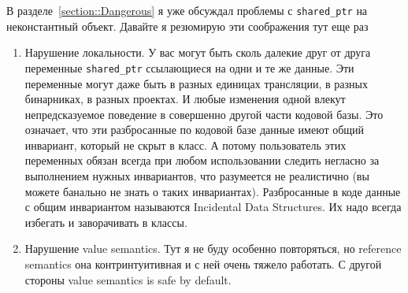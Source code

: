 В разделе~\ref{section::Dangerous} я уже обсуждал проблемы с \texttt{shared\_ptr} на неконстантный объект.
Давайте я резюмирую эти соображения тут еще раз
\begin{enumerate}
\item Нарушение локальности.
У вас могут быть сколь далекие друг от друга переменные \texttt{shared\_ptr} ссылающиеся на одни и те же данные.
Эти переменные могут даже быть в разных единицах трансляции, в разных бинарниках, в разных проектах.
И любые изменения одной влекут непредсказуемое поведение в совершенно другой части кодовой базы.
Это означает, что эти разбросанные по кодовой базе данные имеют общий инвариант, который не скрыт в класс.
А потому пользователь этих переменных обязан всегда при любом использовании следить негласно за выполнением нужных инвариантов, что разумеется не реалистично (вы можете банально не знать о таких инвариантах).
Разбросанные в коде данные с общим инвариантом называются Incidental Data Structures.
Их надо всегда избегать и заворачивать в классы.

\item Нарушение value semantics.
Тут я не буду особенно повторяться, но reference semantics она контринтуитивная и с ней очень тяжело работать.
С другой стороны value semantics is safe by default.
\end{enumerate}
